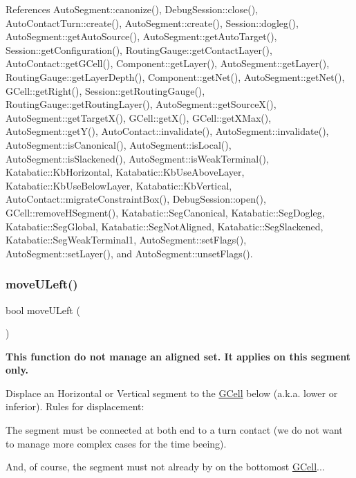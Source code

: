 References Auto\+Segment\+::canonize(), Debug\+Session\+::close(), Auto\+Contact\+Turn\+::create(), Auto\+Segment\+::create(), Session\+::dogleg(), Auto\+Segment\+::get\+Auto\+Source(), Auto\+Segment\+::get\+Auto\+Target(), Session\+::get\+Configuration(), Routing\+Gauge\+::get\+Contact\+Layer(), Auto\+Contact\+::get\+G\+Cell(), Component\+::get\+Layer(), Auto\+Segment\+::get\+Layer(), Routing\+Gauge\+::get\+Layer\+Depth(), Component\+::get\+Net(), Auto\+Segment\+::get\+Net(), G\+Cell\+::get\+Right(), Session\+::get\+Routing\+Gauge(), Routing\+Gauge\+::get\+Routing\+Layer(), Auto\+Segment\+::get\+Source\+X(), Auto\+Segment\+::get\+Target\+X(), G\+Cell\+::get\+X(), G\+Cell\+::get\+X\+Max(), Auto\+Segment\+::get\+Y(), Auto\+Contact\+::invalidate(), Auto\+Segment\+::invalidate(), Auto\+Segment\+::is\+Canonical(), Auto\+Segment\+::is\+Local(), Auto\+Segment\+::is\+Slackened(), Auto\+Segment\+::is\+Weak\+Terminal(), Katabatic\+::\+Kb\+Horizontal, Katabatic\+::\+Kb\+Use\+Above\+Layer, Katabatic\+::\+Kb\+Use\+Below\+Layer, Katabatic\+::\+Kb\+Vertical, Auto\+Contact\+::migrate\+Constraint\+Box(), Debug\+Session\+::open(), G\+Cell\+::remove\+H\+Segment(), Katabatic\+::\+Seg\+Canonical, Katabatic\+::\+Seg\+Dogleg, Katabatic\+::\+Seg\+Global, Katabatic\+::\+Seg\+Not\+Aligned, Katabatic\+::\+Seg\+Slackened, Katabatic\+::\+Seg\+Weak\+Terminal1, Auto\+Segment\+::set\+Flags(), Auto\+Segment\+::set\+Layer(), and Auto\+Segment\+::unset\+Flags().

\mbox{\label{classKatabatic_1_1AutoHorizontal_a1fa2421b74bf0eb934b7002fd3da2321}} 
\subsubsection{\texorpdfstring{move\+U\+Left()}{moveULeft()}}
{\footnotesize\ttfamily bool move\+U\+Left (\begin{DoxyParamCaption}{ }\end{DoxyParamCaption})\hspace{0.3cm}{\ttfamily [virtual]}}

{\bfseries This function do not manage an aligned set. It applies on {\ttfamily this} segment only.}

Displace an Horizontal or Vertical segment to the \mbox{\hyperlink{classKatabatic_1_1GCell}{G\+Cell}} below (a.\+k.\+a. lower or inferior). Rules for displacement\+:
\begin{DoxyItemize}
\item The segment must be connected at both end to a turn contact (we do not want to manage more complex cases for the time beeing).
\item And, of course, the segment must not already by on the bottomost \mbox{\hyperlink{classKatabatic_1_1GCell}{G\+Cell}}...
\end{DoxyItemize}

